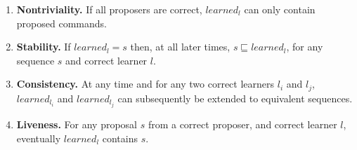 %
\begin{enumerate}
\item \textbf{Nontriviality.} If all proposers are correct, $learned_l$ can only contain proposed commands.
\item \textbf{Stability.} If $learned_l = s$ then, at all later times, $s \sqsubseteq learned_l$, for any sequence $s$ and correct learner $l$.
\item \textbf{Consistency.} At any time and for any two correct learners $l_i$ and $l_j$, $learned_{l_i}$ and $learned_{l_j}$ can subsequently be extended to equivalent sequences.
\item \textbf{Liveness.} For any proposal $s$ from a correct proposer, and correct learner $l$, eventually $learned_l$ contains $s$.
\end{enumerate}
